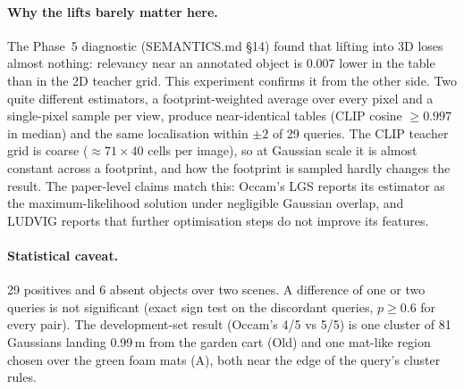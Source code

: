 \paragraph{Why the lifts barely matter here.} The Phase~5 diagnostic (SEMANTICS.md \S14) found that lifting into 3D
loses almost nothing: relevancy near an annotated object is 0.007 lower in the table than in the 2D teacher grid. This
experiment confirms it from the other side. Two quite different estimators, a footprint-weighted average over every
pixel and a single-pixel sample per view, produce near-identical tables (CLIP cosine $\geq0.997$ in median) and the
same localisation within $\pm2$ of 29 queries. The CLIP teacher grid is coarse ($\approx71\times40$ cells per image), so
at Gaussian scale it is almost constant across a footprint, and how the footprint is sampled hardly changes the result.
The paper-level claims match this: Occam's LGS reports its estimator as the maximum-likelihood solution under
negligible Gaussian overlap, and LUDVIG reports that further optimisation steps do not improve its features.

\paragraph{Statistical caveat.} 29 positives and 6 absent objects over two scenes. A difference of one or two queries
is not significant (exact sign test on the discordant queries, $p\geq0.6$ for every pair). The development-set result (Occam's 4/5 vs 5/5) is one cluster of
81 Gaussians landing 0.99\,m from the garden cart (Old) and one mat-like region chosen over the green foam mats (A),
both near the edge of the query's cluster rules.

